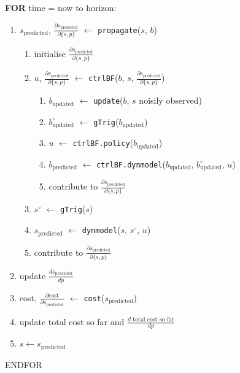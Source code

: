 \documentclass[9pt]{article}
\newcommand{\trg}[1]{#1^\circ}              %
\begin{document}
{{\vspace{0.3cm}\hspace{0.1cm} \textbf{FOR} time = now to horizon: \vspace{-0.1cm}
\begin{enumerate}
 \item $s_\text{predicted}$, $\frac{\partial s_\text{predicted}}{\partial \{s,p\}}$ $\leftarrow$ \texttt{propagate}($s$, $b$)
 \begin{enumerate}
  \item initialise $\frac{\partial s_\text{predicted}}{\partial \{s,p\}}$
  \item $u$, $\frac{\partial s_\text{predicted}}{\partial \{s,p\}}$ $\leftarrow$ \texttt{ctrlBF}($b$, $s$, $\frac{\partial s_\text{predicted}}{\partial \{s,p\}}$)
  \begin{enumerate}
   \item $b_{\text{updated}}$ $\leftarrow$ \texttt{update}($b$, $s$ noisily observed)
   \item $\trg{b_{\text{updated}}}$ $\leftarrow$ \texttt{gTrig}($b_{\text{updated}}$)
   \item $u$ $\leftarrow$ \texttt{ctrlBF.policy}($b_{\text{updated}}$)
   \item $b_\text{predicted}$ $\leftarrow$ \texttt{ctrlBF.dynmodel}($b_{\text{updated}}$, $\trg{b_{\text{updated}}}$, $u$)
   \item contribute to $\frac{\partial s_\text{predicted}}{\partial \{s,p\}}$
  \end{enumerate}
  \item $\trg{s}$ $\leftarrow$ \texttt{gTrig}($s$)
  \item $s_\text{predicted}$ $\leftarrow$ \texttt{dynmodel}($s$, $\trg{s}$, $u$)
  \item contribute to $\frac{\partial s_\text{predicted}}{\partial \{s,p\}}$
 \end{enumerate}
 \item update $\frac{d s_\text{predicted}}{d p}$
 \item cost, $\frac{\partial \text{cost}}{\partial s_\text{predicted}}$ $\leftarrow$ \texttt{cost}($s_\text{predicted}$)
 \item update total cost so far and $\frac{d \text{ total cost so far}}{d p}$
 \item $s \leftarrow s_\text{predicted}$
\end{enumerate}
\hspace{0.1cm} ENDFOR
}}

\vspace{0.5cm}
\end{document}
